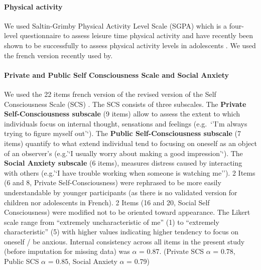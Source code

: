 \documentclass[preprint, 3p,
authoryear]{elsarticle} %
\begin{document}
\hypertarget{physical-activity}{%
\paragraph{Physical activity}\label{physical-activity}}

We used Saltin-Grimby Physical Activity Level Scale (SGPA) which is a
four-level questionnaire to assess leisure time physical activity
\citep{grimby_saltin-grimby_2015} and have recently been shown to be
successfully to assess physical activity levels in adolescents
\citep{beldo_criterion_2022}. We used the french version recently used
by\citep{isoard-gautheur_relationships_2023}.

\hypertarget{private-and-public-self-consciousness-scale-and-social-anxiety}{%
\paragraph{Private and Public Self Consciousness Scale and Social
Anxiety}\label{private-and-public-self-consciousness-scale-and-social-anxiety}}

We used the 22 items french version \citep{pelletier_lechelle_1990} of
the revised version \citep{scheier_self-consciousness_1985} of the Self
Consciousness Scale (SCS) \citep{fenigstein_public_1975}. The SCS
consists of three subscales. The \textbf{Private Self-Consciousness
subscale} (9 items) allow to assess the extent to which individuals
focus on internal thought, sensations and feelings (e.g.~`'I'm always
trying to figure myself out'`). The \textbf{Public Self-Consciousness
subscale} (7 items) quantify to what extend individual tend to focusing
on oneself as an object of an observer's (e.g.'`I usually worry about
making a good impression'`). The \textbf{Social Anxiety subscale} (6
items), measures distress caused by interacting with others (e.g.'`I
have trouble working when someone is watching me''). 2 Items (6 and 8,
Private Self-Consciousness) were rephrased to be more easily
understandable by younger participants (as there is no validated version
for children nor adolescents in French). 2 Items (16 and 20, Social Self
Consciousness) were modified not to be oriented toward appearance. The
Likert scale range from ``extremely uncharacteristic of me'' (1) to
``extremely characteristic'' (5) with higher values indicating higher
tendency to focus on oneself / be anxious. Internal consistency across
all items in the present study (before imputation for missing data) was
\(\alpha\) = 0.87. (Private SCS \(\alpha\) = 0.78, Public SCS \(\alpha\)
= 0.85, Social Anxiety \(\alpha\) = 0.79)
\end{document}
